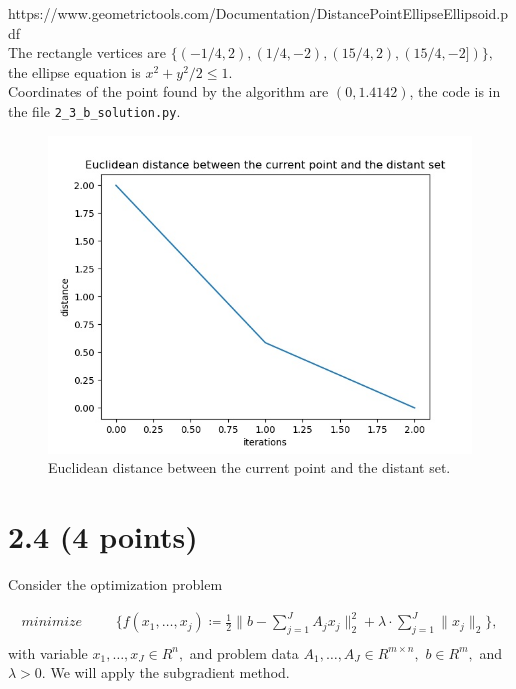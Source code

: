 \documentclass{article}
\begin{document}
https://www.geometrictools.com/Documentation/DistancePointEllipseEllipsoid.pdf \\

The rectangle vertices are $\{(-1/4, 2), (1/4, -2), (15/4, 2), (15/4, -2])\}, $ the ellipse equation is $x^2 + y^2 / 2 \leq 1.$\\

Coordinates of the point found by the algorithm are 
$(0,  1.4142)$, the code is in the file \verb!2_3_b_solution.py!.

\begin{figure}[H]
	\includegraphics[width=\linewidth]{2_3_b_fig.jpeg}
	\caption{Euclidean distance between the current point and the distant set.}
	\label{fig:2_3_b_fig}
\end{figure}

\section*{2.4 (4 points)} 
Consider the optimization problem

\begin{align*}
	minimize & && 
	\bigg \{ f(x_1, \dots, x_j) \coloneqq
	\frac{1}{2} \lVert b - \sum_{j = 1}^{J} 
	A_j x_j \rVert_2^2 
	+ \lambda \cdot   \sum_{j = 1}^{J} 
	\lVert x_j \rVert_2
	\bigg \},
	\\
\end{align*}
with variable $x_1, \dots, x_J \in R^n, $ and 
problem data $A_1, \dots, A_J \in R^{m \times n}, $ 
$b \in R^m,$ and $\lambda > 0.$ We will apply the subgradient method. \\
\end{document}
